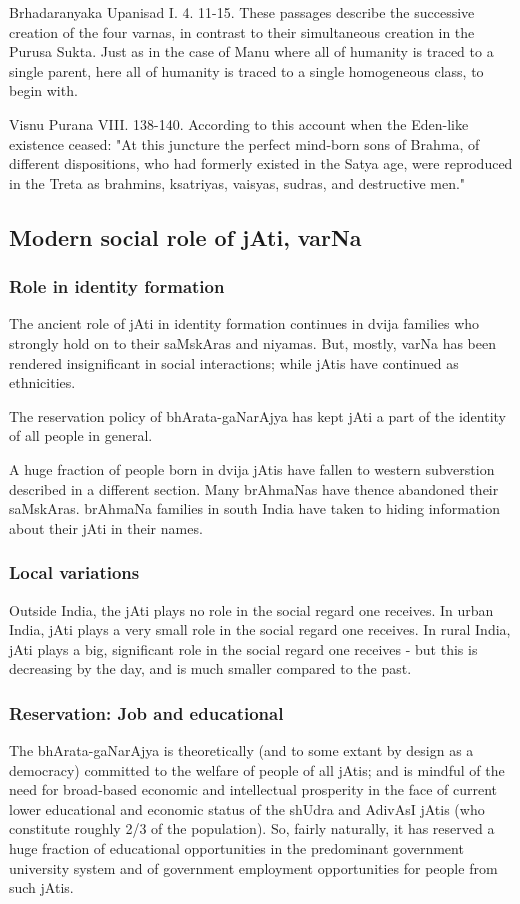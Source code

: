 \documentclass[oneside, article]{memoir}
\begin{document}
Brhadaranyaka Upanisad I. 4. 11-15. These passages describe the successive creation of the four varnas, in contrast to their simultaneous creation in the Purusa Sukta. Just as in the case of Manu where all of humanity is traced to a single parent, here all of humanity is traced to a single homogeneous class, to begin with.

Visnu Purana VIII. 138-140. According to this account when the Eden-like existence ceased: "At this juncture the perfect mind-born sons of Brahma, of different dispositions, who had formerly existed in the Satya age, were reproduced in the Treta as brahmins, ksatriyas, vaisyas, sudras, and destructive men."

\subsection{Modern social role of jAti, varNa}
\subsubsection{Role in identity formation}
The ancient role of jAti in identity formation continues in dvija families who strongly hold on to their saMskAras and niyamas. But, mostly, varNa has been rendered insignificant in social interactions; while jAtis have continued as ethnicities.

The reservation policy of bhArata-gaNarAjya has kept jAti a part of the identity of all people in general.

A huge fraction of people born in dvija jAtis have fallen to western subverstion described in a different section. Many brAhmaNas have thence abandoned their saMskAras. brAhmaNa families in south India have taken to hiding information about their jAti in their names.

\subsubsection{Local variations}
Outside India, the jAti plays no role in the social regard one receives. In urban India, jAti plays a very small role in the social regard one receives. In rural India, jAti plays a big, significant role in the social regard one receives - but this is decreasing by the day, and is much smaller compared to the past.

\subsubsection{Reservation: Job and educational}
The bhArata-gaNarAjya is  theoretically (and to some extant by design as a democracy) committed to the welfare of people of all jAtis; and is mindful of the need for broad-based economic and intellectual prosperity in the face of current lower educational and economic status of the shUdra and AdivAsI jAtis (who constitute roughly 2/3 of the population). So, fairly naturally, it has reserved a huge fraction of educational opportunities in the predominant government university system and of government employment opportunities for people from such jAtis.
\end{document}
